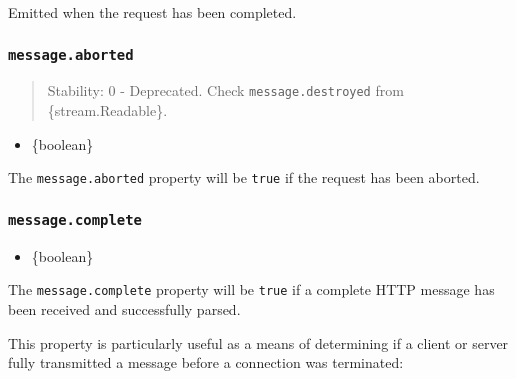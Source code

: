 Emitted when the request has been completed.

\subsubsection{\texorpdfstring{\texttt{message.aborted}}{message.aborted}}\label{message.aborted}

\begin{quote}
Stability: 0 - Deprecated. Check \texttt{message.destroyed} from
\{stream.Readable\}.
\end{quote}

\begin{itemize}
\tightlist
\item
  \{boolean\}
\end{itemize}

The \texttt{message.aborted} property will be \texttt{true} if the
request has been aborted.

\subsubsection{\texorpdfstring{\texttt{message.complete}}{message.complete}}\label{message.complete}

\begin{itemize}
\tightlist
\item
  \{boolean\}
\end{itemize}

The \texttt{message.complete} property will be \texttt{true} if a
complete HTTP message has been received and successfully parsed.

This property is particularly useful as a means of determining if a
client or server fully transmitted a message before a connection was
terminated:

\begin{Shaded}
\begin{Highlighting}[]
\OperatorTok{=}\NormalTok{(\{}
  \OperatorTok{:} \OperatorTok{,}
  \OperatorTok{:} \OperatorTok{,}
  \OperatorTok{:} \OperatorTok{,}
\NormalTok{\}}\OperatorTok{,}\KeywordTok{=\textgreater{}}\NormalTok{ \{}
\NormalTok{()}\OperatorTok{;}
\NormalTok{(}\OperatorTok{,}\NormalTok{ () }\KeywordTok{=\textgreater{}}\NormalTok{ \{}
    \NormalTok{ (}\OperatorTok{!}\NormalTok{)}
      \NormalTok{(}
        \NormalTok{)}\OperatorTok{;}
\NormalTok{  \})}\OperatorTok{;}
\NormalTok{\})}\OperatorTok{;}
\end{Highlighting}
\end{Shaded}

